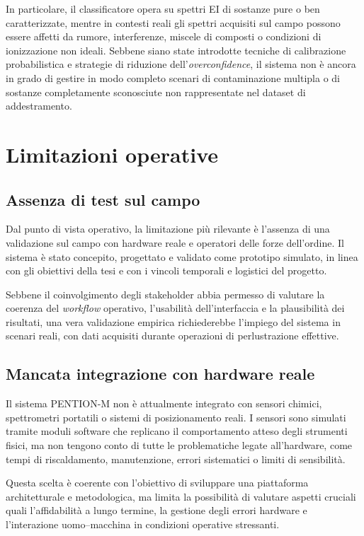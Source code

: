 In particolare, il classificatore opera su spettri EI di sostanze pure o ben caratterizzate, mentre in contesti reali gli spettri acquisiti sul campo possono essere affetti da rumore, interferenze, miscele di composti o condizioni di ionizzazione non ideali.
Sebbene siano state introdotte tecniche di calibrazione probabilistica e strategie di riduzione dell’\textit{overconfidence}, il sistema non è ancora in grado di gestire in modo completo scenari di contaminazione multipla o di sostanze completamente sconosciute non rappresentate nel dataset di addestramento.

\section{Limitazioni operative}

\subsection{Assenza di test sul campo}

Dal punto di vista operativo, la limitazione più rilevante è l’assenza di una validazione sul campo con hardware reale e operatori delle forze dell’ordine.
Il sistema è stato concepito, progettato e validato come prototipo simulato, in linea con gli obiettivi della tesi e con i vincoli temporali e logistici del progetto.

Sebbene il coinvolgimento degli stakeholder abbia permesso di valutare la coerenza del \textit{workflow} operativo, l’usabilità dell’interfaccia e la plausibilità dei risultati, una vera validazione empirica richiederebbe l’impiego del sistema in scenari reali, con dati acquisiti durante operazioni di perlustrazione effettive.

\subsection{Mancata integrazione con hardware reale}

Il sistema \textsc{PENTION-M} non è attualmente integrato con sensori chimici, spettrometri portatili o sistemi di posizionamento reali.
I sensori sono simulati tramite moduli software che replicano il comportamento atteso degli strumenti fisici, ma non tengono conto di tutte le problematiche legate all’hardware, come tempi di riscaldamento, manutenzione, errori sistematici o limiti di sensibilità.

Questa scelta è coerente con l’obiettivo di sviluppare una piattaforma architetturale e metodologica, ma limita la possibilità di valutare aspetti cruciali quali l’affidabilità a lungo termine, la gestione degli errori hardware e l’interazione uomo–macchina in condizioni operative stressanti.

